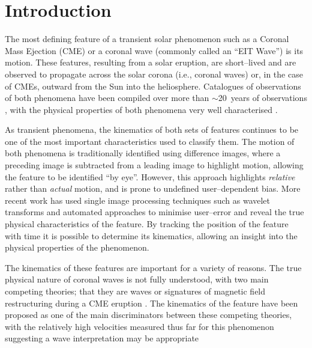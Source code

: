 \documentclass[structabstract]{aa}
\begin{document}
\maketitle

%

\section{Introduction}
\label{sect_intro}

The most defining feature of a transient solar phenomenon such as a Coronal Mass Ejection (CME) or a coronal wave (commonly called an ``EIT Wave'') is its motion. These features, resulting from a solar eruption, are short--lived and are observed to propagate across the solar corona (i.e., coronal waves) or, in the case of CMEs, outward from the Sun into the heliosphere. 
Catalogues of observations of both phenomena have been compiled over more than $\sim$20~years of observations \citep[e.g.,][]{Illing:1985fk,Yashiro:2004uq,Thompson:2009vn}, with the physical properties of both phenomena very well characterised \citep[see the reviews by e.g., ][]{Gallagher:2011ys,Patsourakos:2012zr,Howard:2011ve,Webb:2012ly}. 

As transient phenomena, the kinematics of both sets of features continues to be one of the most important characteristics used to classify them. The motion of both phenomena is traditionally identified using difference images, where a preceding image is subtracted from a leading image to highlight motion, allowing the feature to be identified ``by eye''. However, this approach highlights \emph{relative} rather than \emph{actual} motion, and is prone to undefined user--dependent bias. More recent work has used single image processing techniques such as wavelet transforms \citep{2009A&A...495..325B,Morgan:2012bh} and automated approaches \citep[e.g.,][]{Long:2011qf,2012ApJ...752..145B,Podladchikova:2012cr} to minimise user--error and reveal the true physical characteristics of the feature. By tracking the position of the feature with time it is possible to determine its kinematics, allowing an insight into the physical properties of the phenomenon. 

The kinematics of these features are important for a variety of reasons. The true physical nature of coronal waves is not fully understood, with two main competing theories; that they are waves \citep[e.g.,][]{2012ApJ...754....7S,2010ApJ...716L..57V} or signatures of magnetic field restructuring during a CME eruption \citep[e.g.,][]{2011ApJ...738..167S,2011ApJ...732L..20C}. The kinematics of the feature have been proposed as one of the main discriminators between these competing theories, with the relatively high velocities measured thus far for this phenomenon suggesting a wave interpretation may be appropriate \citep{Warmuth:2011kx,2012ApJ...753..112Z}
\end{document}
